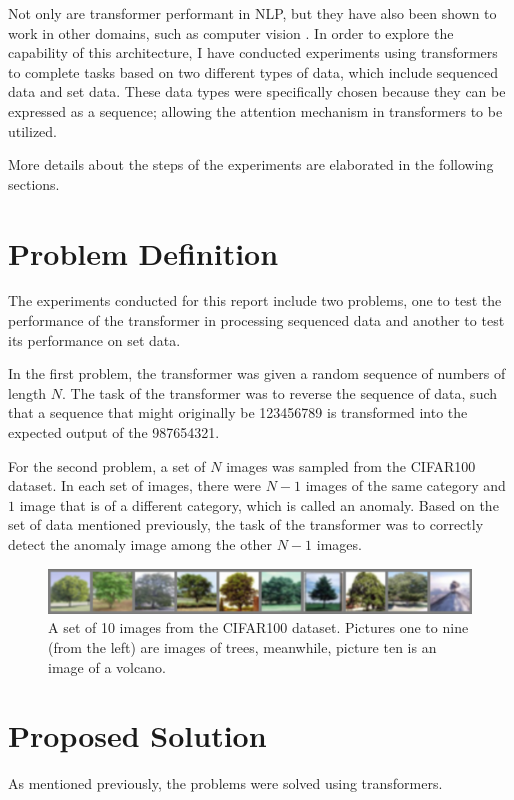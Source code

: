 \documentclass[peerreview]{IEEEtran}
\begin{document}
Not only are transformer performant in NLP, but they have also been shown to work in other domains, such as computer vision \cite{dosovitskiy_2021}. In order to explore the capability of this architecture, I have conducted experiments using transformers to complete tasks based on two different types of data, which include sequenced data and set data. These data types were specifically chosen because they can be expressed as a sequence; allowing the attention mechanism in transformers to be utilized.

More details about the steps of the experiments are elaborated in the following sections.


\section{Problem Definition}
The experiments conducted for this report include two problems, one to test the performance of the transformer in processing sequenced data and another to test its performance on set data.

In the first problem, the transformer was given a random sequence of numbers of length $N$. The task of the transformer was to reverse the sequence of data, such that a sequence that might originally be 123456789 is transformed into the expected output of the 987654321.

For the second problem, a set of $N$ images was sampled from the CIFAR100 dataset. In each set of images, there were $N-1$ images of the same category and $1$ image that is of a different category, which is called an anomaly. Based on the set of data mentioned previously, the task of the transformer was to correctly detect the anomaly image among the other $N-1$ images.

\begin{figure}[!h]
\centering
\includegraphics[width=0.8\columnwidth]{imageset} 
\caption{A set of 10 images from the CIFAR100 dataset. Pictures one to nine (from the left) are images of trees, meanwhile, picture ten is an image of a volcano.}
\label{fig_image_set}
\end{figure}


\section{Proposed Solution}
As mentioned previously, the problems were solved using transformers. 
\end{document}
